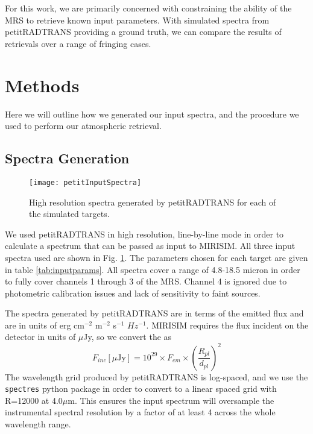 For this work, we are primarily concerned with constraining the ability of the MRS to retrieve known input parameters. 
With simulated spectra from petitRADTRANS providing a ground truth, we can compare the results of retrievals over a range of fringing cases.
\section{Methods}
Here we will outline how we generated our input spectra, and the procedure we used to perform our atmospheric retrieval.
\subsection{Spectra Generation}
\begin{figure}[t]
	\texttt{[image: petitInputSpectra]}
	\caption{High resolution spectra generated by petitRADTRANS for each of the simulated targets.}
	\label{fig:petitinput}
\end{figure}
We used petitRADTRANS in high resolution, line-by-line mode in order to calculate a spectrum that can be passed as input to MIRISIM.
All three input spectra used are shown in Fig. \ref{fig:petitinput}.
The parameters chosen for each target are given in table \ref{tab:inputparams}. 
All spectra cover a range of 4.8-18.5 micron in order to fully cover channels 1 through 3 of the MRS. 
Channel 4 is ignored due to photometric calibration issues and lack of sensitivity to faint sources.

The spectra generated by petitRADTRANS are in terms of the emitted flux and are in units of erg cm$^{-2}$ m$^{-2}$ s$^{-1}$ $Hz^{-1}$. 
MIRISIM requires the flux incident on the detector in units of $\mu$Jy, so we convert the as 
\begin{equation}
F_{inc} [\mu\textrm{Jy}] = 10^{29}\times F_{em} \times \left(\frac{R_{pl}}{d_{pl}}\right)^{2}
\end{equation}
The wavelength grid produced by petitRADTRANS is log-spaced, and we use the \verb|spectres| python package \parencite{Carnall2017} in order to convert to a linear spaced grid with R=12000 at 4.0$\mu$m. 
This ensures the input spectrum will oversample the instrumental spectral resolution by a factor of at least 4 across the whole wavelength range.

